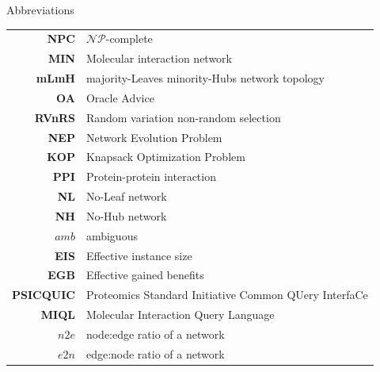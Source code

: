\documentclass[12pt]{article}
\newcommand{\myC}[1]{{$\mathcal{#1}$}}
\begin{document}
\newpage
\Large{Abbreviations}
\begin{table}[H]
        \setlength\arrayrulewidth{.1pt}
    \begin{tabular}[H]{r|l}
            \textbf{NPC}    & \myC{NP}-complete \\
            \textbf{MIN}    & Molecular interaction network \\
            \textbf{mLmH}   & majority-Leaves minority-Hubs network topology \\
            \textbf{OA}     & Oracle Advice \\
            \textbf{RVnRS}  & Random variation non-random selection \\
            \textbf{NEP}    & Network Evolution Problem \\
            \textbf{KOP}    & Knapsack Optimization Problem \\
            \textbf{PPI}    & Protein-protein interaction \\
            \textbf{NL}     & No-Leaf network \\
            \textbf{NH}     & No-Hub network \\
            \textbf{$amb$}  & ambiguous \\
            \textbf{EIS}    & Effective instance size \\
            \textbf{EGB}    & Effective gained benefits \\
            \textbf{PSICQUIC} & Proteomics Standard Initiative Common QUery InterfaCe \\
            \textbf{MIQL} & Molecular Interaction Query Language \\
            ${n2e}$ & node:edge ratio of a network \\
            ${e2n}$ & edge:node ratio of a network \\
    \end{tabular}
\end{table}
\end{document}
